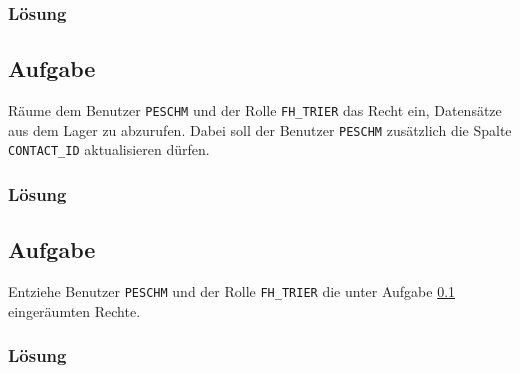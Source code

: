 \subsubsection*{Lösung}
\label{sec:uebung_03.aufgabe_06.loesung}

\subsection{Aufgabe}
\label{sec:uebung_03.aufgabe_07}
Räume dem Benutzer \texttt{PESCHM} und der Rolle \texttt{FH\_TRIER} das Recht ein, Datensätze aus dem Lager zu abzurufen. Dabei soll der Benutzer \texttt{PESCHM} zusätzlich die Spalte \texttt{CONTACT\_ID} aktualisieren dürfen.

\subsubsection*{Lösung}
\label{sec:uebung_03.aufgabe_07.loesung}

\subsection{Aufgabe}
\label{sec:uebung_03.aufgabe_08}
Entziehe Benutzer \texttt{PESCHM} und der Rolle \texttt{FH\_TRIER} die unter Aufgabe \ref{sec:uebung_03.aufgabe_07} eingeräumten Rechte.

\subsubsection*{Lösung}
\label{sec:uebung_03.aufgabe_08.loesung}
